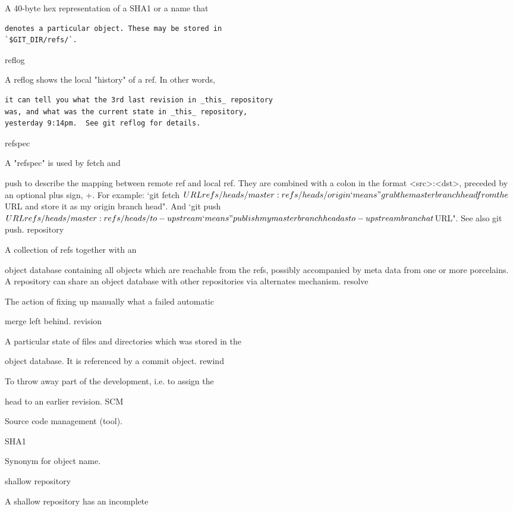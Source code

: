 A 40-byte hex representation of a SHA1 or a name that
\scriptsize
\begin{verbatim}
denotes a particular object. These may be stored in
`$GIT_DIR/refs/`.
\end{verbatim}
\normalsize

reflog

A reflog shows the local "history" of a ref. In other words,
\scriptsize
\begin{verbatim}
it can tell you what the 3rd last revision in _this_ repository
was, and what was the current state in _this_ repository,
yesterday 9:14pm.  See git reflog for details.
\end{verbatim}
\normalsize

refspec

A "refspec" is used by fetch and

push to describe the mapping between remote
ref and local ref. They are combined with a colon in
the format <src>:<dst>, preceded by an optional plus sign, +.
For example: `git fetch $URL
refs/heads/master:refs/heads/origin` means "grab the master
branch head from the $URL and store
it as my origin branch head". And `git push
$URL refs/heads/master:refs/heads/to-upstream` means "publish my
master branch head as to-upstream branch at $URL". See also
git push.
repository

A collection of refs together with an

object database containing all objects
which are reachable from the refs, possibly
accompanied by meta data from one or more porcelains. A
repository can share an object database with other repositories
via alternates mechanism.
resolve

The action of fixing up manually what a failed automatic

merge left behind.
revision

A particular state of files and directories which was stored in the

object database. It is referenced by a
commit object.
rewind

To throw away part of the development, i.e. to assign the

head to an earlier revision.
SCM

Source code management (tool).

SHA1

Synonym for object name.

shallow repository

A shallow repository has an incomplete

